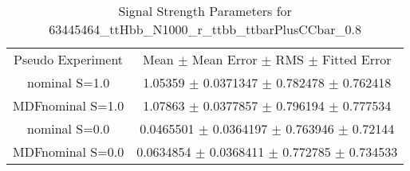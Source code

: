 \begin{table}
\centering
\caption{Signal Strength Parameters for 63445464\_ttHbb\_N1000\_r\_ttbb\_ttbarPlusCCbar\_0.8}
\begin{tabular}{cc}
\toprule
Pseudo Experiment & Mean $\pm$ Mean Error $\pm$ RMS $\pm$ Fitted Error\\
nominal S=1.0 & \num{1.05359} $\pm$ \num{0.0371347} $\pm$ \num{0.782478} $\pm$ \num{0.762418}\\
MDFnominal S=1.0 & \num{1.07863} $\pm$ \num{0.0377857} $\pm$ \num{0.796194} $\pm$ \num{0.777534}\\
nominal S=0.0 & \num{0.0465501} $\pm$ \num{0.0364197} $\pm$ \num{0.763946} $\pm$ \num{0.72144}\\
MDFnominal S=0.0 & \num{0.0634854} $\pm$ \num{0.0368411} $\pm$ \num{0.772785} $\pm$ \num{0.734533}\\
\bottomrule
\end{tabular}
\end{table}